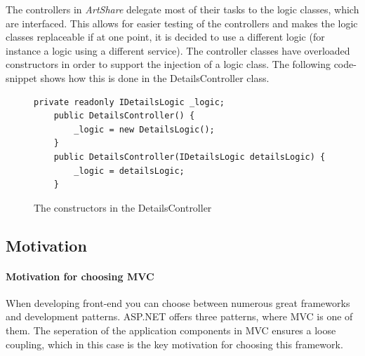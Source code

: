 \documentclass[../report.tex]{subfiles}
\begin{document}
The controllers in \textit{ArtShare} delegate most of their tasks to the logic classes, which are interfaced. This allows for easier testing of the controllers and makes the logic classes replaceable if at one point, it is decided to use a different logic (for instance a logic using a different service). The controller classes have overloaded constructors in order to support the injection of a logic class. The following code-snippet shows how this is done in the DetailsController class.

\begin{figure}[H]
\begin{lstlisting}[frame=tb]
	private readonly IDetailsLogic _logic;
	public DetailsController() {
		_logic = new DetailsLogic();
	}
	public DetailsController(IDetailsLogic detailsLogic) {
		_logic = detailsLogic;
	}
\end{lstlisting}
\caption{The constructors in the DetailsController}
\end{figure}




\subsection{Motivation}

\paragraph{Motivation for choosing MVC}
When developing front-end you can choose between numerous great frameworks and development patterns. ASP.NET offers three patterns, where MVC is one of them. The seperation of the application components in MVC ensures a loose coupling, which in this case is the key motivation for choosing this framework.
\end{document}

